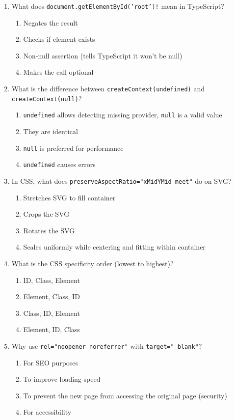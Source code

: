 \documentclass[12pt,a4paper]{article}
\begin{document}
\begin{enumerate}
\item What does \texttt{document.getElementById('root')!} mean in TypeScript?
\begin{enumerate}[label=\Alph*)]
    \item Negates the result
    \item Checks if element exists
    \item Non-null assertion (tells TypeScript it won't be null)
    \item Makes the call optional
\end{enumerate}

\item What is the difference between \texttt{createContext(undefined)} and \texttt{createContext(null)}?
\begin{enumerate}[label=\Alph*)]
    \item \texttt{undefined} allows detecting missing provider, \texttt{null} is a valid value
    \item They are identical
    \item \texttt{null} is preferred for performance
    \item \texttt{undefined} causes errors
\end{enumerate}

\item In CSS, what does \texttt{preserve\-Aspect\-Ratio="xMidYMid meet"} do on SVG?
\begin{enumerate}[label=\Alph*)]
    \item Stretches SVG to fill container
    \item Crops the SVG
    \item Rotates the SVG
    \item Scales uniformly while centering and fitting within container
\end{enumerate}

\item What is the CSS specificity order (lowest to highest)?
\begin{enumerate}[label=\Alph*)]
    \item ID, Class, Element
    \item Element, Class, ID
    \item Class, ID, Element
    \item Element, ID, Class
\end{enumerate}

\item Why use \texttt{rel="noopener noreferrer"} with \texttt{target="\_blank"}?
\begin{enumerate}[label=\Alph*)]
    \item For SEO purposes
    \item To improve loading speed
    \item To prevent the new page from accessing the original page (security)
    \item For accessibility
\end{enumerate}


\end{enumerate}
\end{document}
